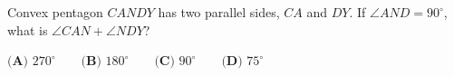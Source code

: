 Convex pentagon $CANDY$ has two parallel sides, $CA$ and $DY$. If $\angle AND=90^\circ$, what is $\angle CAN+\angle NDY$?

$\textbf{(A) }270^\circ\qquad\textbf{(B) }180^\circ\qquad\textbf{(C) }90^\circ\qquad\textbf{(D) }75^\circ$
